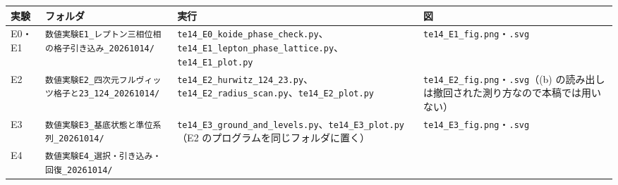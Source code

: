 \documentclass[
  a4paper,
]{ltjsarticle}
\newcounter{none} %
\begin{document}
{\def\LTcaptype{none} %
\begin{longtable}[]{@{}
  >{\raggedright\arraybackslash}p{}
  >{\raggedright\arraybackslash}p{}
  >{\raggedright\arraybackslash}p{}
  >{\raggedright\arraybackslash}p{}@{}}
\toprule\noalign{}
\begin{minipage}[b]{\linewidth}\raggedright
実験
\end{minipage} & \begin{minipage}[b]{\linewidth}\raggedright
フォルダ
\end{minipage} & \begin{minipage}[b]{\linewidth}\raggedright
実行
\end{minipage} & \begin{minipage}[b]{\linewidth}\raggedright
図
\end{minipage} \\
\midrule\noalign{}
\endhead
\bottomrule\noalign{}
\endlastfoot
E0・E1 & \texttt{数値実験E1\_\allowbreak{}レプトン三相位相の格子引き込み\_\allowbreak{}20261014/\allowbreak{}}
&
\texttt{te14\_\allowbreak{}E0\_\allowbreak{}koide\_\allowbreak{}phase\_\allowbreak{}check.py}、\texttt{te14\_\allowbreak{}E1\_\allowbreak{}lepton\_\allowbreak{}phase\_\allowbreak{}lattice.py}、\texttt{te14\_\allowbreak{}E1\_\allowbreak{}plot.py}
& \texttt{te14\_\allowbreak{}E1\_\allowbreak{}fig.png}・\texttt{.svg} \\
E2 & \texttt{数値実験E2\_\allowbreak{}四次元フルヴィッツ格子と23\_\allowbreak{}124\_\allowbreak{}20261014/\allowbreak{}} &
\texttt{te14\_\allowbreak{}E2\_\allowbreak{}hurwitz\_\allowbreak{}124\_\allowbreak{}23.py}、\texttt{te14\_\allowbreak{}E2\_\allowbreak{}radius\_\allowbreak{}scan.py}、\texttt{te14\_\allowbreak{}E2\_\allowbreak{}plot.py}
& \texttt{te14\_\allowbreak{}E2\_\allowbreak{}fig.png}・\texttt{.svg}（(b)
の読み出しは撤回された測り方なので本稿では用いない） \\
E3 & \texttt{数値実験E3\_\allowbreak{}基底状態と準位系列\_\allowbreak{}20261014/\allowbreak{}} &
\texttt{te14\_\allowbreak{}E3\_\allowbreak{}ground\_\allowbreak{}and\_\allowbreak{}levels.py}、\texttt{te14\_\allowbreak{}E3\_\allowbreak{}plot.py}（E2
のプログラムを同じフォルダに置く） &
\texttt{te14\_\allowbreak{}E3\_\allowbreak{}fig.png}・\texttt{.svg} \\
E4 & \texttt{数値実験E4\_\allowbreak{}選択・引き込み・回復\_\allowbreak{}20261014/\allowbreak{}} &

\end{longtable}}
\end{document}
